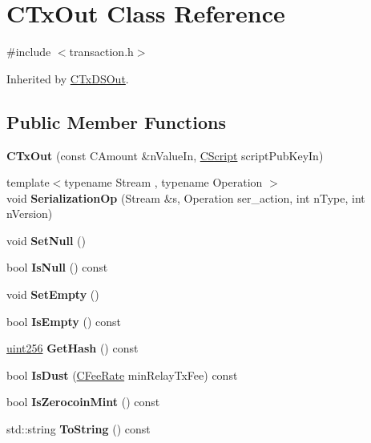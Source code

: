 \hypertarget{class_c_tx_out}{}\section{C\+Tx\+Out Class Reference}
\label{class_c_tx_out}


{\ttfamily \#include $<$transaction.\+h$>$}



Inherited by \mbox{\hyperlink{class_c_tx_d_s_out}{C\+Tx\+D\+S\+Out}}.

\subsection*{Public Member Functions}
\begin{DoxyCompactItemize}
\item 
\mbox{\label{class_c_tx_out_adc5daeba4e26f1807cee8ec3cc138ef8}} 
{\bfseries C\+Tx\+Out} (const C\+Amount \&n\+Value\+In, \mbox{\hyperlink{class_c_script}{C\+Script}} script\+Pub\+Key\+In)
\item 
\mbox{\label{class_c_tx_out_a88e5e2f069325d6bb1936ee75935f121}} 
{\footnotesize template$<$typename Stream , typename Operation $>$ }\\void {\bfseries Serialization\+Op} (Stream \&s, Operation ser\+\_\+action, int n\+Type, int n\+Version)
\item 
\mbox{\label{class_c_tx_out_a9fe5e6a1be651f130d3dc84a64e78a24}} 
void {\bfseries Set\+Null} ()
\item 
\mbox{\label{class_c_tx_out_ab92a3c4c95c643f7b3ffd3ffa7cd7055}} 
bool {\bfseries Is\+Null} () const
\item 
\mbox{\label{class_c_tx_out_aef15a8068187af08b25a7ddfbf8d7744}} 
void {\bfseries Set\+Empty} ()
\item 
\mbox{\label{class_c_tx_out_ae5eab8e2d01f678135b8891645db6b78}} 
bool {\bfseries Is\+Empty} () const
\item 
\mbox{\label{class_c_tx_out_af97a27e75b8698951bacc4c5a6ca70af}} 
\mbox{\hyperlink{classuint256}{uint256}} {\bfseries Get\+Hash} () const
\item 
\mbox{\label{class_c_tx_out_ad4440670c7b3a59b46fa44f2f032ded8}} 
bool {\bfseries Is\+Dust} (\mbox{\hyperlink{class_c_fee_rate}{C\+Fee\+Rate}} min\+Relay\+Tx\+Fee) const
\item 
\mbox{\label{class_c_tx_out_a94d2d89e02ab1e8a7d0c2326aaa35725}} 
bool {\bfseries Is\+Zerocoin\+Mint} () const
\item 
\mbox{\label{class_c_tx_out_affdc44390970a14812fe9179768495ef}} 
std\+::string {\bfseries To\+String} () const
\end{DoxyCompactItemize}
